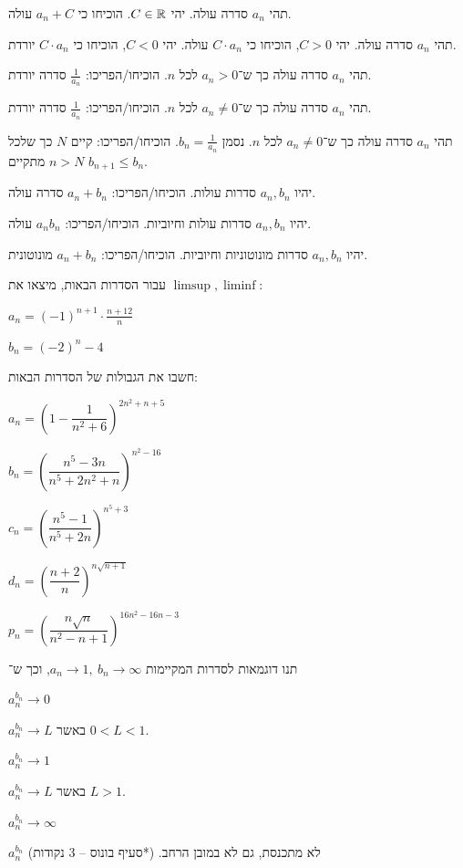 \documentclass{infi-ex}
\begin{document}
\begin{question}
\begin{parts}
  \item תהי $a_n$ סדרה עולה. יהי $C\in\mathbb{R}$. הוכיחו כי $a_n+C$ עולה.
  \item תהי $a_n$ סדרה עולה. יהי $C>0$, הוכיחו כי $C\cdot a_n$ עולה. יהי $C<0$, הוכיחו כי $C\cdot a_n$ יורדת.
  \item תהי $a_n$ סדרה עולה כך ש־$a_n>0$ לכל $n$. הוכיחו/הפריכו: $\frac1{a_n}$ סדרה יורדת.
  \item תהי $a_n$ סדרה עולה כך ש־$a_n\neq0$ לכל $n$. הוכיחו/הפריכו: $\frac1{a_n}$ סדרה יורדת.
  \item תהי $a_n$ סדרה עולה כך ש־$a_n\neq0$ לכל $n$. נסמן $b_n=\frac1{a_n}$. הוכיחו/הפריכו: קיים $N$ כך שלכל $n>N$ מתקיים $b_{n+1}\le b_n$.
  \item יהיו $a_n,b_n$ סדרות עולות. הוכיחו/הפריכו: $a_n+b_n$ סדרה עולה.
  \item יהיו $a_n,b_n$ סדרות עולות וחיוביות. הוכיחו/הפריכו: $a_nb_n$ עולה.
  \item יהיו $a_n,b_n$ סדרות מונוטוניות וחיוביות. הוכיחו/הפריכו: $a_n+b_n$ מונוטונית.
\end{parts}
\end{question}

\begin{question}
עבור הסדרות הבאות, מיצאו את $\limsup,\liminf$:
\begin{parts}
  \item $a_n=(-1)^{n+1}\cdot\frac{n+12}{n}$
  \item $b_n=(-2)^n-4$
\end{parts}
\end{question}

\begin{question}
חשבו את הגבולות של הסדרות הבאות:
\begin{parts}
  \item $a_n=\left(1-\dfrac1{n^2+6}\right)^{2n^2+n+5}$
  \item $b_n=\left(\dfrac{n^5-3n}{n^5+2n^2+n}\right)^{n^2-16}$
  \item $c_n=\left(\dfrac{n^5-1}{n^5+2n}\right)^{n^5+3}$
  \item $d_n=\left(\dfrac{n+2}{n}\right)^{n\sqrt{n+1}}$
  \item $p_n=\left(\dfrac{n\sqrt n}{n^2-n+1}\right)^{16n^2-16n-3}$
\end{parts}
\end{question}

\begin{question}
תנו דוגמאות לסדרות המקיימות $a_n\to1,\ b_n\to\infty$, וכך ש־
\begin{parts}
  \item $a_n^{b_n}\to0$
  \item $a_n^{b_n}\to L$ באשר $0<L<1$.
  \item $a_n^{b_n}\to1$
  \item $a_n^{b_n}\to L$ באשר $L>1$.
  \item $a_n^{b_n}\to\infty$
  \item $a_n^{b_n}$ לא מתכנסת, גם לא במובן הרחב. (*סעיף בונוס -- 3 נקודות)
\end{parts}
\end{question}
\end{document}
